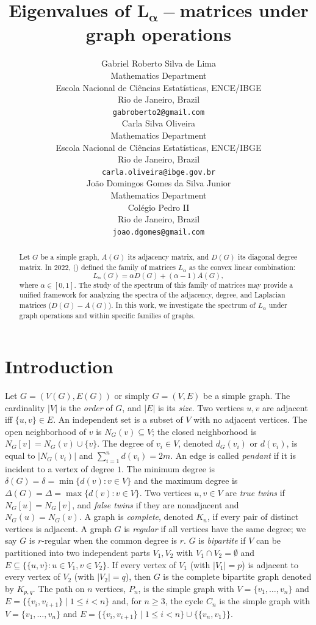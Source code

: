 \documentclass{article}
\title{Eigenvalues of $\boldsymbol{L_\alpha}-$matrices under graph operations
}
\author{
    Gabriel Roberto Silva de Lima\\
    Mathematics Department \\
    Escola Nacional de Ciências Estatísticas, ENCE/IBGE \\
    Rio de Janeiro, Brazil\\
     \texttt{gabroberto2@gmail.com}\\
    \And
   Carla Silva Oliveira\orcidlink{0000-0001-6684-8811} \\
  Mathematics Department \\
  Escola Nacional de Ciências Estatísticas, ENCE/IBGE \\
  Rio de Janeiro, Brazil\\
  \texttt{carla.oliveira@ibge.gov.br} \\
   \And
  João Domingos Gomes da Silva Junior\orcidlink{0000-0002-1745-0302}\\
  Mathematics Department \\
  Colégio Pedro II \\
  Rio de Janeiro, Brazil \\
  \texttt{joao.dgomes@gmail.com} \\
}
\begin{document}
\maketitle


\begin{abstract}
    Let $G$ be a simple graph, $A(G)$ its adjacency matrix, and $D(G)$ its diagonal degree matrix. In 2022, \citeauthor{Wang2020} (\cite{Wang2020}) defined the family of matrices $L_\alpha$ as the convex linear combination:
    \[
    L_\alpha(G) = \alpha D(G) + (\alpha - 1)A(G),
    \]
    where $\alpha \in [0,1]$. 
    The study of the spectrum of this family of matrices may provide a unified framework for analyzing 
    the spectra of the adjacency, degree, and Laplacian matrices ($D(G) - A(G)$). 
    In this work, we investigate the spectrum of $L_\alpha$ under graph operations 
    and within specific families of graphs.
\end{abstract}




\section{Introduction}\label{sec1}
Let $G=(V(G),E(G))$ or simply $G=(V,E)$ be a simple graph. The cardinality $|V|$ is the \textit{order} of $G$, and $|E|$ is its \textit{size}. Two vertices $u,v$ are adjacent iff $\{u,v\}\in E$. An independent set is a subset of $V$ with no adjacent vertices. The open neighborhood of \( v \) is \( N_G(v) \subseteq V \); the closed neighborhood is \( N_G[v]=N_G(v)\cup\{v\} \). The degree of \( v_i \in V \), denoted \( d_G(v_i) \) or \( d(v_i) \), is equal to $|N_G(v_i)|$ and $\displaystyle \sum_{i=1}^{n} d(v_i)=2m.$ An edge is called \textit{pendant} if it is incident to a vertex of degree $1$. The minimum degree is $\delta(G)=\delta=\min\{d(v):v\in V\}$ and the maximum degree is $\Delta(G)=\Delta=\max\{d(v):v\in V\}$. Two vertices $u,v\in V$ are \emph{true twins} if \( N_G[u]=N_G[v] \), and \emph{false twins} if they are nonadjacent and \( N_G(u)=N_G(v) \). A graph is \emph{complete}, denoted $K_n$, if every pair of distinct vertices is adjacent. A graph $G$ is \emph{regular} if all vertices have the same degree; we say $G$ is $r$-regular when the common degree is $r$. $G$ is \emph{bipartite} if $V$ can be partitioned into two independent parts $V_1,V_2$ with $V_1\cap V_2=\emptyset$ and $E\subseteq \{\{u,v\}:u\in V_1, v\in V_2\}$. If every vertex of $V_1$ (with $|V_1|=p$) is adjacent to every vertex of $V_2$ (with $|V_2|=q$), then $G$ is the complete bipartite graph  denoted by $K_{p,q}$. The path on $n$ vertices, $P_n$, is the simple graph with $V=\{v_1,\dots,v_n\}$ and $E=\{\{v_i,v_{i+1}\}\mid 1\le i<n\}$ and, for $n\ge 3$, the cycle $C_n$ is the simple graph with $V=\{v_1,\dots,v_n\}$ and $E=\{\{v_i,v_{i+1}\}\mid 1\le i<n\}\cup \{\{v_n,v_1\}\}$.
\end{document}
